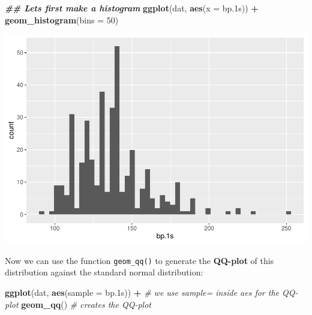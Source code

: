 \documentclass[
]{book}
\newenvironment{Shaded}{\begin{snugshade}}{\end{snugshade}}
\newcommand{\AttributeTok}[1]{\textcolor[rgb]{0.13,0.29,0.53}{#1}}
\newcommand{\CommentTok}[1]{\textcolor[rgb]{0.56,0.35,0.01}{\textit{#1}}}
\newcommand{\DecValTok}[1]{\textcolor[rgb]{0.00,0.00,0.81}{#1}}
\newcommand{\DocumentationTok}[1]{\textcolor[rgb]{0.56,0.35,0.01}{\textbf{\textit{#1}}}}
\newcommand{\FloatTok}[1]{\textcolor[rgb]{0.00,0.00,0.81}{#1}}
\newcommand{\FunctionTok}[1]{\textcolor[rgb]{0.13,0.29,0.53}{\textbf{#1}}}
\newcommand{\NormalTok}[1]{#1}
\newcommand{\SpecialCharTok}[1]{\textcolor[rgb]{0.81,0.36,0.00}{\textbf{#1}}}
\begin{document}
\begin{Shaded}
\begin{Highlighting}[]
\DocumentationTok{\#\# Let\textquotesingle{}s first make a histogram}
\FunctionTok{ggplot}\NormalTok{(dat,}
       \FunctionTok{aes}\NormalTok{(}\AttributeTok{x =}\NormalTok{ bp}\FloatTok{.1}\NormalTok{s)) }\SpecialCharTok{+}
  \FunctionTok{geom\_histogram}\NormalTok{(}\AttributeTok{bins =} \DecValTok{50}\NormalTok{)}
\end{Highlighting}
\end{Shaded}

\includegraphics{_main_files/figure-latex/unnamed-chunk-50-1.pdf}

Now we can use the function \texttt{geom\_qq()} to generate the \textbf{QQ-plot} of this distribution against the standard normal distribution:

\begin{Shaded}
\begin{Highlighting}[]
\FunctionTok{ggplot}\NormalTok{(dat,}
       \FunctionTok{aes}\NormalTok{(}\AttributeTok{sample =}\NormalTok{ bp}\FloatTok{.1}\NormalTok{s)) }\SpecialCharTok{+}     \CommentTok{\# we use sample= inside aes for the QQ{-}plot}
  \FunctionTok{geom\_qq}\NormalTok{()                       }\CommentTok{\# creates the QQ{-}plot}
\end{Highlighting}
\end{Shaded}
\end{document}
